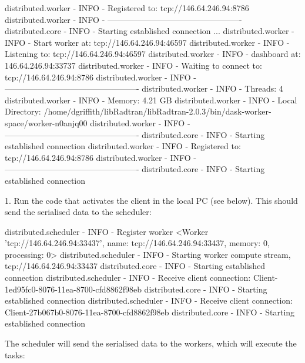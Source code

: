         distributed.worker - INFO -         Registered to:   tcp://146.64.246.94:8786
        distributed.worker - INFO - -------------------------------------------------
        distributed.core - INFO - Starting established connection
        ...
        distributed.worker - INFO -       Start worker at:  tcp://146.64.246.94:46597
        distributed.worker - INFO -          Listening to:  tcp://146.64.246.94:46597
        distributed.worker - INFO -          dashboard at:        146.64.246.94:33737
        distributed.worker - INFO - Waiting to connect to:   tcp://146.64.246.94:8786
        distributed.worker - INFO - -------------------------------------------------
        distributed.worker - INFO -               Threads:                          4
        distributed.worker - INFO -                Memory:                    4.21 GB
        distributed.worker - INFO -       Local Directory: /home/dgriffith/libRadtran/libRadtran-2.0.3/bin/dask-worker-space/worker-n0anjq00
        distributed.worker - INFO - -------------------------------------------------
        distributed.core - INFO - Starting established connection
        distributed.worker - INFO -         Registered to:   tcp://146.64.246.94:8786
        distributed.worker - INFO - -------------------------------------------------
        distributed.core - INFO - Starting established connection


1. Run the code that activates the client in the local PC (see below). This should send the serialised data to the scheduler:

        distributed.scheduler - INFO - Register worker <Worker 'tcp://146.64.246.94:33437', name: tcp://146.64.246.94:33437, memory: 0, processing: 0>
        distributed.scheduler - INFO - Starting worker compute stream, tcp://146.64.246.94:33437
        distributed.core - INFO - Starting established connection
        distributed.scheduler - INFO - Receive client connection: Client-1ed95fc0-8076-11ea-8700-cfd8862f98eb
        distributed.core - INFO - Starting established connection
        distributed.scheduler - INFO - Receive client connection: Client-27b067b0-8076-11ea-8700-cfd8862f98eb
        distributed.core - INFO - Starting established connection

    The scheduler will send the serialised data to the workers, which will execute the tasks:
    
